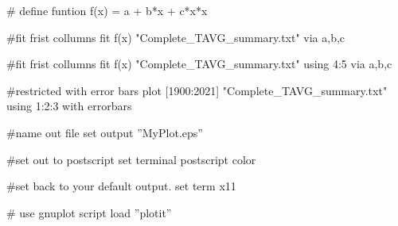  # define funtion
f(x) = a + b*x + c*x*x  

 #fit frist collumns 
fit f(x) "Complete_TAVG_summary.txt" via a,b,c

#fit frist collumns 
fit f(x) "Complete_TAVG_summary.txt" using 4:5  via a,b,c  

#restricted with error bars
plot [1900:2021] "Complete_TAVG_summary.txt" using 1:2:3 with errorbars

#name out file
set output ''MyPlot.eps''

#set out to postscript 
set terminal postscript color

#set back to your default output.
set term x11

# use gnuplot script
load ''plotit''



